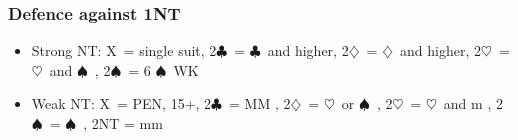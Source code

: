 \documentclass{article}
\newcommand\C{\ensuremath{\clubsuit}}
\newcommand\D{\ensuremath{\diamondsuit}}
\renewcommand\H{\ensuremath{\heartsuit}}
\renewcommand\S{\ensuremath{\spadesuit}}
\newcommand\X{{\footnotesize X}}
\begin{document}
\begin{multicols}{2}
  \subsubsection{Defence against 1NT}
  \label{oneNTdef}
  \begin{itemize}
    \item Strong NT: \X\ = single suit, 2\C\ = \C\ and higher, 2\D\ = \D\ and higher, 2\H\ = \H\ and \S\ , 2\S\ = 6 \S\ WK
    \item Weak NT: \X\ = PEN, 15+, 2\C\ = MM , 2\D\ = \H\ or \S\ , 2\H\ = \H\ and m , 2\S\ =  \S\ , 2NT = mm
    \end{itemize}
\end{multicols}
\end{document}
